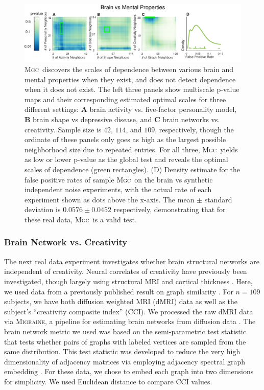 \documentclass[11pt]{article}
\providecommand{\sct}[1]{{\normalfont\textsc{#1}}}
\newcommand{\Migraine}{\sct{Migraine}}
\newcommand{\Mgc}{\sct{Mgc}}
\begin{document}
\begin{figure}[htbp]
\includegraphics[width=1.0\textwidth]{Figures/FigReal}
\caption{\Mgc~discovers the scales of dependence between various brain and mental properties when they exist, and does not detect dependence when it does not exist.  The left three panels show multiscale p-value maps and their corresponding estimated optimal scales for three different settings: \textbf{A}  brain activity vs. five-factor personality model, \textbf{B}  brain shape vs depressive disease, and \textbf{C} brain networks vs. creativity. Sample size is $42$, $114$, and $109$, respectively, though the ordinate of these panels only goes as high as the largest possible neighborhood size due to repeated entries.  
For all three, \Mgc~yields as low or lower p-value as the global test and reveals the optimal scales of dependence (green rectangles).
(D) Density estimate for the false positive rates of sample \Mgc~on the brain vs synthetic independent noise experiments, with the actual rate of each experiment shown as dots above the x-axis. The mean $\pm$ standard deviation is $0.0576 \pm 0.0452$ respectively, demonstrating that for these real data, \Mgc~is  a valid test.}
\label{f:real}
\end{figure}

\subsubsection*{Brain Network vs. Creativity}

The next real data experiment investigates whether brain structural networks are independent of creativity.  Neural correlates of creativity have previously been investigated, though largely using structural MRI and cortical thickness \cite{Jung2009}.  Here, we used data from a previously published result on graph similarity \cite{Koutra15a}. For  $n=109$ subjects, we have both diffusion weighted MRI (dMRI) data as well as the subject's ``creativity composite index'' (CCI).  We processed the raw dMRI data via \Migraine, a pipeline for estimating brain networks from diffusion data \cite{GrayRoncal2013}.   
The brain network metric we used was based on  the semi-parametric test statistic \cite{Tang2016} that tests whether pairs of graphs with labeled vertices are sampled from the same distribution.  This test statistic was developed to reduce  the very high dimensionality of adjacency matrices via employing adjacency spectral graph embedding  \cite{Sussman2013}. For these data, we chose to embed each graph into two dimensions for simplicity. We used Euclidean distance to compare CCI values. 
\end{document}
